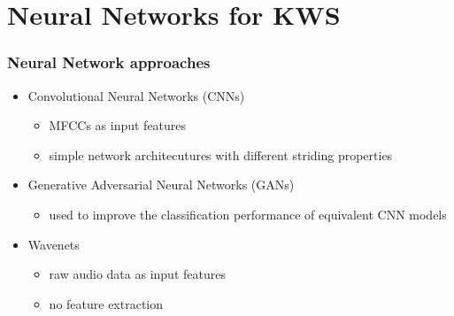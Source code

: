 
\section{Neural Networks for KWS}

\begin{frame}
  \frametitle{Neural Network approaches}
  \begin{itemize}
    \item Convolutional Neural Networks (CNNs)
    \begin{itemize}
      \item MFCCs as input features
      \item simple network architecutures with different striding properties
    \end{itemize}
    \item Generative Adversarial Neural Networks (GANs)
    \begin{itemize}
      \item used to improve the classification performance of equivalent CNN models
    \end{itemize}
    \item Wavenets
    \begin{itemize}
      \item raw audio data as input features
      \item no feature extraction
    \end{itemize}
  \end{itemize}
\end{frame}

